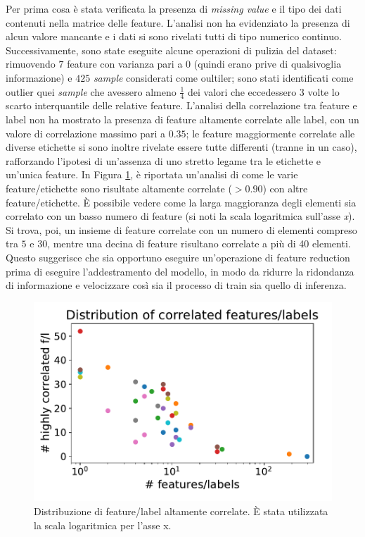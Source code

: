 Per prima cosa è stata verificata la presenza di \textit{missing value} e il tipo dei dati contenuti nella matrice delle feature. L'analisi non ha evidenziato la presenza di alcun valore mancante e i dati si sono rivelati tutti di tipo numerico continuo. 
Successivamente, sono state eseguite alcune operazioni di pulizia del dataset: rimuovendo $7$ feature con varianza pari a $0$ (quindi erano prive di qualsivoglia informazione) e $425$ \textit{sample} considerati come oultiler; sono stati identificati come outlier quei \textit{sample} che avessero almeno $\frac{1}{4}$ dei valori che eccedessero $3$ volte lo scarto interquantile delle relative feature.
L'analisi della correlazione tra feature e label non ha mostrato la presenza di feature altamente correlate alle label, con un valore di correlazione massimo pari a $0.35$; le feature maggiormente correlate alle diverse etichette si sono inoltre rivelate essere tutte differenti (tranne in un caso), rafforzando l'ipotesi di un'assenza di uno stretto legame tra le etichette e un'unica feature.
In Figura \ref{fig:distributionhighcorr}, è riportata un'analisi di come le varie feature/etichette sono risultate altamente correlate ($> 0.90$) con altre feature/etichette. È possibile vedere come la larga maggioranza degli elementi sia correlato con un basso numero di feature (si noti la scala logaritmica sull'asse \textit{x}).
Si trova, poi, un insieme di feature correlate con un numero di elementi compreso tra $5$ e $30$, mentre una decina di feature risultano correlate a più di 40 elementi. Questo suggerisce che sia opportuno eseguire un'operazione di feature reduction prima di eseguire l'addestramento del modello, in modo da ridurre la ridondanza di informazione  e velocizzare così sia il processo di train sia quello di inferenza. 
\begin{figure}
	\centering
	\includegraphics[width=0.7\linewidth]{../images/pdf/distribution_high_corr}
	\caption{Distribuzione di feature/label altamente correlate. È stata utilizzata la scala logaritmica per l'asse x.}
	\label{fig:distributionhighcorr}
\end{figure}
